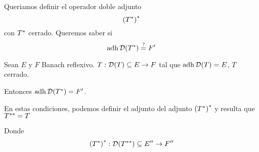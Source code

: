 
\renewcommand{\catnum}{\theNPclase \ No Presencial}%
\renewcommand{\fecha}{28 de abril de 2020}


Queriamos definir el operador doble adjunto $$
{({T}^{*})}^{*} 
$$ con ${T}^{*}$ cerrado. Queremos saber si $$
\operatorname{\mathop{\text{\upshape{adh}}}} \mathcal{D} ({T}^{*}) \overset{?}{=}  F'
$$

\begin{thm}
Sean $E$ y $F$ Banach reflexivo. $T: \mathcal{D}({T}) \subseteq E \to F$ tal que $\operatorname{\mathop{\text{\upshape{adh}}}} \mathcal{D}(T) = E$, $T$ cerrado.

Entonces $\operatorname{\mathop{\text{\upshape{adh}}}} \mathcal{D} ({T}^{*} ) = F'$.

\end{thm}

En estas condiciones, podemos definir el adjunto del adjunto ${({T}^{*})}^{*}$ y resulta que ${T}^{**} = T$

Donde $$
\deffuncs{
\adjc{(\adjc{T})}
}{\cd(\dadjc{T}) \subseteq E''}{F''}
$$

